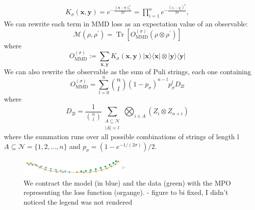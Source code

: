 $$ 
\begin{aligned} K_\sigma(\boldsymbol{x}, \boldsymbol{y}) =e^{-\frac{\|\boldsymbol{x}-\boldsymbol{y}\|_2^2}{2 \sigma}}  =\prod_{i=1}^n e^{-\frac{\left(x_i-y_i\right)^2}{2 \sigma}},\end{aligned}
$$
We can rewrite each term in MMD loss as an expectation value of an observable:
$$ \mathcal{M}\left(\rho, \rho^{\prime}\right)=\operatorname{Tr}\left[O_{\mathrm{MMD}}^{(\sigma)}\left(\rho \otimes \rho^{\prime}\right)\right] $$
where
$$
O_{\mathrm{MMD}}^{(\sigma)}:=\sum_{\boldsymbol{x}, \boldsymbol{y}} K_\sigma(\boldsymbol{x}, \boldsymbol{y})|\boldsymbol{x}\rangle\langle\boldsymbol{x}| \otimes|\boldsymbol{y}\rangle\langle\boldsymbol{y}|
$$
We can also rewrite the observable as the sum of Puli strings, each one containing
$$
O_{\mathrm{MMD}}^{(\sigma)}=\sum_{l=0}^n\binom{n}{l}\left(1-p_\sigma\right)^{n-l} p_\sigma^l D_{2 l}
$$
where
$$ D_{2 l}=\frac{1}{\binom{n}{l}} \sum_{\substack{A \subseteq \mathcal{N} \\|A|=l}} \bigotimes_{i \in A}\left(Z_i \otimes Z_{n+i}\right) $$
where the summation runs over all possible combinations of strings of length l
$ A \subseteq \mathcal{N}=\{1,2, \ldots, n\} $
and
$ p_\sigma=\left(1-e^{-1 /(2 \sigma)}\right) / 2 $.
\begin{figure}[h]
    \centering
    \includegraphics[width=0.5\textwidth]{images/mpo1.png}
    \caption{We contract the model (in blue) and the data (green) with the MPO representing the loss function (organge). - figure to bi fixed, I didn't noticed the legend was not rendered}
    \label{fig:example}
\end{figure}

